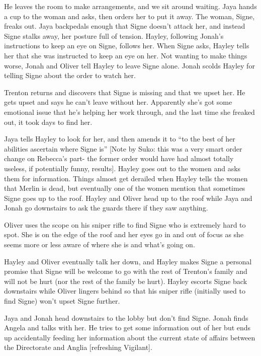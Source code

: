 He leaves the room to make arrangements, and we sit around waiting.  Jaya hands a cup to the woman and asks, then orders her to put it away.  The woman, Signe, freaks out.  Jaya backpedals enough that Signe doesn't attack her, and instead Signe stalks away, her posture full of tension.  Hayley, following Jonah's instructions to keep an eye on Signe, follows her.  When Signe asks, Hayley tells her that she was instructed to keep an eye on her.  Not wanting to make things worse, Jonah and Oliver tell Hayley to leave Signe alone.  Jonah scolds Hayley for telling Signe about the order to watch her. 



Trenton returns and discovers that Signe is missing and that we upset her. He gets upset and says he can't leave without her.  Apparently she's got some emotional issue that he's helping her work through, and the last time she freaked out, it took days to find her.



Jaya tells Hayley to look for her, and then amends it to ``to the best of her abilities ascertain where Signe is'' {[}Note by Suko: this was a very smart order change on Rebecca's part- the former order would have had almost totally useless, if potentially funny, results{]}.  Hayley goes out to the women and asks them for information.  Things almost get derailed when Hayley tells the women that Merlin is dead, but eventually one of the women mention that sometimes Signe goes up to the roof.  Hayley and Oliver head up to the roof while Jaya and Jonah go downstairs to ask the guards there if they saw anything.



Oliver uses the scope on his sniper rifle to find Signe who is extremely hard to spot.  She is on the edge of the roof and her eyes go in and out of focus as she seems more or less aware of where she is and what's going on.



Hayley and Oliver eventually talk her down, and Hayley makes Signe a personal promise that Signe will be welcome to go with the rest of Trenton's family and will not be hurt (nor the rest of the family be hurt).  Hayley escorts Signe back downstairs while Oliver lingers behind so that his sniper rifle (initially used to find Signe) won't upset Signe further.



Jaya and Jonah head downstairs to the lobby but don't find Signe.  Jonah finds Angela and talks with her.  He tries to get some information out of her but ends up accidentally feeding her information about the current state of affairs between the Directorate and Anglia {[}refreshing Vigilant{]}.



